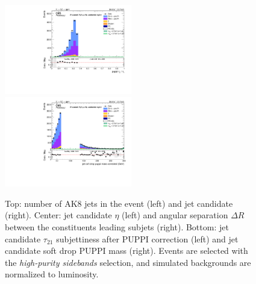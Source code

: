 \begin{figure}[!htb]
\begin{center}
    \includegraphics[width=0.495\textwidth]{plots/v9_U/XVZnnhpSB/FatJet1_puppiTau21.pdf}
    \includegraphics[width=0.495\textwidth]{plots/v9_U/XVZnnhpSB/FatJet1_softdropPuppiMassCorr.pdf}

    \caption{Top: number of AK8 jets in the event (left) and \V jet candidate \pt (right). Center: \V jet candidate $\eta$ (left) and angular separation $\Delta R$ between the constituents leading subjets (right). Bottom: \V jet candidate $\tau_{21}$ subjettiness after PUPPI correction (left) and \V jet candidate soft drop PUPPI mass (right). Events are selected with the \emph{high-purity sidebands} selection, and simulated backgrounds are normalized to luminosity.}
  \end{center}
\end{figure}


